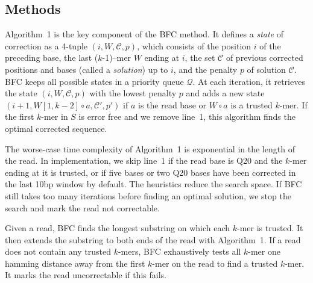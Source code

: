 \documentclass{bioinfo}
\begin{document}
\begin{methods}
\section{Methods}
Algorithm~1 is the key component of the BFC method. It defines a \emph{state}
of correction as a 4-tuple $(i,W,\mathcal{C},p)$, which consists of the
position $i$ of the preceding base, the last \mbox{($k$-1)--mer} $W$ ending at
$i$, the set $\mathcal{C}$ of previous corrected positions and bases (called a
\emph{solution}) up to $i$, and the penalty $p$ of solution $\mathcal{C}$. BFC
keeps all possible states in a priority queue $\mathcal{Q}$. At each iteration,
it retrieves the state $(i,W,\mathcal{C},p)$ with the lowest penalty $p$ and
adds a new state $(i+1,W[1,k-2]\circ a,\mathcal{C}',p')$ if $a$ is the read
base or $W\circ a$ is a trusted $k$-mer. If the first $k$-mer in $S$ is
error free and we remove line~1, this algorithm finds the optimal corrected
sequence.

The worse-case time complexity of Algorithm~1 is exponential in the length of
the read. In implementation, we skip line~1 if the read base is Q20 and the
$k$-mer ending at it is trusted, or if five bases or two Q20 bases have been
corrected in the last 10bp window by default. The heuristics reduce the
search space. If BFC still takes too many iterations before finding an optimal
solution, we stop the search and mark the read not correctable.

Given a read, BFC finds the longest substring on which each $k$-mer is trusted. It
then extends the substring to both ends of the read with Algorithm~1. If a read
does not contain any trusted $k$-mers, BFC exhaustively tests all $k$-mer
one hamming distance away from the first $k$-mer on the read to find a trusted
$k$-mer. It marks the read uncorrectable if this fails.


\end{methods}
\end{document}
